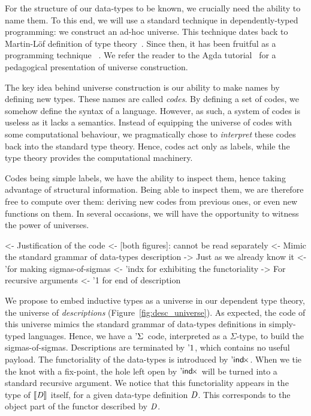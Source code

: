 For the structure of our data-types to be known, we crucially need the
ability to name them.  To this
end, we will use a standard technique in dependently-typed programming: we
construct an ad-hoc universe. This technique dates back to Martin-L\"of
definition of type theory~\cite{martin-lof:itt}. Since then, it has been
fruitful as a programming 
technique~\cite{benke:universe-generic-prog, oury:power-of-pi}
. 
We refer the reader to the Agda tutorial~\cite{norell:agda-tutorial} for a
pedagogical presentation of universe construction. 


The key idea behind universe construction is our ability to make names
by defining new types. These names are called \emph{codes}. By
defining a set of codes, we somehow define the syntax of a
language. However, as such, a system of codes is useless as it lacks a
semantics. Instead of equipping the universe of codes with some
computational behaviour, we pragmatically chose to \emph{interpret}
these codes back into the standard type theory. Hence, codes act only
as labels, while the type theory provides the computational
machinery. 

Codes being simple labels, we have the ability to inspect them, hence
taking advantage of structural information. Being able to inspect
them, we are therefore free to compute over them: deriving new codes
from previous ones, or even new functions on them. In several
occasions, we will have the opportunity to witness the power of
universes.

\begin{wstructure}
<- Justification of the code 
    <- [both figures]: cannot be read separately
    <- Mimic the standard grammar of data-types description
        -> Just as we already know it
        <- '\Sigma for making sigmas-of-sigmas
        <- 'indx for exhibiting the functoriality
            -> For recursive arguments
        <- '1 for end of description
\end{wstructure}

We propose to embed inductive types as a universe in our dependent
type theory, the universe of \emph{descriptions}
(Figure~\ref{fig:desc_universe}). As expected, the code of this
universe mimics the standard grammar of data-types definitions in
simply-typed languages. Hence, we have a $\DSigma{\!}{\!}$ code,
interpreted as a $\Sigma$-type, to build the
sigmas-of-sigmas. Descriptions are terminated by $\DUnit$, which
contains no useful payload. The functoriality of the data-types is
introduced by $\DIndx{\!}$. When we tie the knot with a fix-point, the
hole left open by $\DIndx{\!}$ will be turned into a standard
recursive argument. We notice that this functoriality appears in the
type of $\descop{\V{D}}{\!}$ itself, for a given data-type definition
$\V{D}$. This corresponds to the object part of the functor described
by $\V{D}$.

